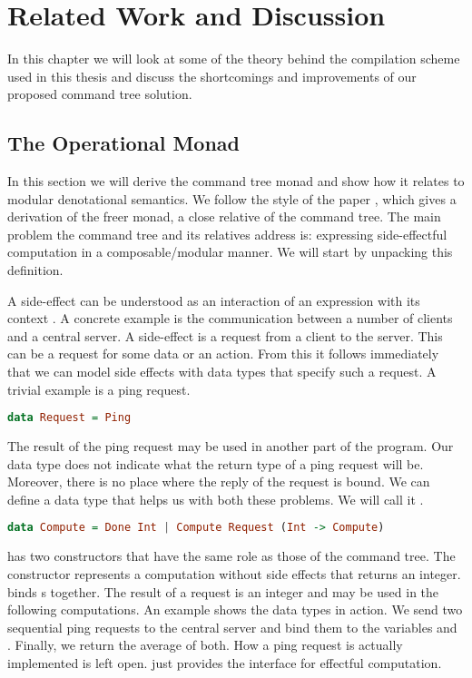 
\chapter{\label{chap:related-work}Related Work and Discussion}
In this chapter we will look at some of the theory behind the compilation scheme used in this thesis and discuss the shortcomings and improvements of our proposed command tree solution.

\section{\label{section:opmonad}The Operational Monad}
In this section we will derive the command tree monad and show how it relates to modular denotational semantics. We follow the style of the paper  \autocite{DBLP:conf/haskell/KiselyovI15}, which gives a derivation of the freer monad, a close relative of the command tree. The main problem the command tree and its relatives address is: expressing side-effectful computation in a composable/modular manner. We will start by unpacking this definition.

A side-effect can be understood as an interaction of an expression with its context \autocite{DBLP:conf/tacs/CartwrightF94}. A concrete example is the communication between a number of clients and a central server. A side-effect is a request from a client to the server. This can be a request for some data or an action. From this it follows immediately that we can model side effects with data types that specify such a request. A trivial example is a ping request.

\begin{lstlisting}[language=Haskell]
data Request = Ping
\end{lstlisting}

The result of the ping request may be used in another part of the program. Our  data type does not indicate what the return type of a ping request will be. Moreover, there is no place where the reply of the request is bound. We can define a data type that helps us with both these problems. We will call it .

\begin{lstlisting}[language=Haskell]
data Compute = Done Int | Compute Request (Int -> Compute)
\end{lstlisting}

 has two constructors that have the same role as those of the command tree. The  constructor represents a computation without side effects that returns an integer.  binds s together. The result of a request is an integer and may be used in the following computations. An example shows the data types in action. We send two sequential ping requests to the central server and bind them to the variables  and . Finally, we return the average of both. How a ping request is actually implemented is left open.  just provides the interface for effectful computation.

